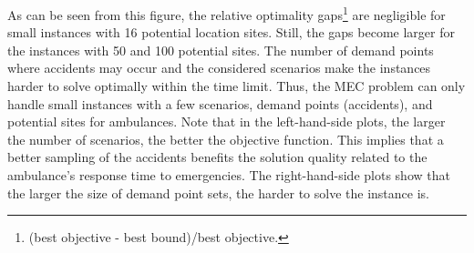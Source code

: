As can be seen from this figure,
the relative optimality gaps\footnote{(best objective -  best bound)/best objective.} are negligible for small instances with 16 potential location sites. Still, the gaps become larger for the instances with 50 and 100 potential sites. The number of demand points where accidents may occur and the considered scenarios make the instances harder to solve optimally within the time limit. Thus, the MEC problem can only handle small instances with a few scenarios, demand points (accidents), and potential sites for ambulances. Note that in the left-hand-side plots, the larger the number of scenarios, the better the objective function. This implies that a better sampling of the accidents benefits the solution quality related to the ambulance's response time to emergencies. The right-hand-side plots show that the larger the size of demand point sets, the harder to solve the instance is. 

